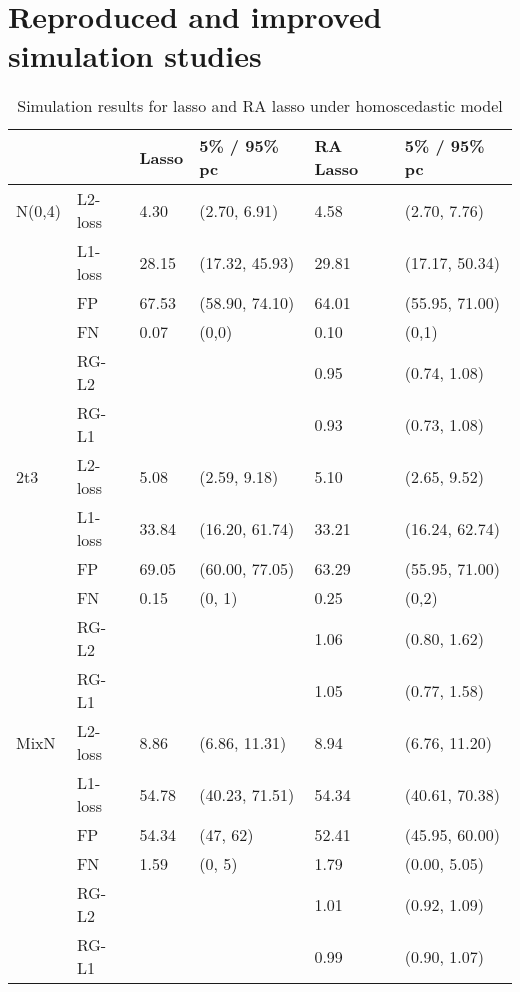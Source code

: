 

\section{Reproduced and improved simulation studies}\label{sec:newsimulation}


\begin{table}[]
\centering
\begin{tabular}{llllll}
       &         & Lasso    & 5\% / 95\% pc & RA Lasso  & 5\% / 95\% pc \\ \hline
N(0,4) & L2-loss & 4.30 & (2.70, 6.91)     & 4.58  & (2.70, 7.76)     \\
       & L1-loss & 28.15 & (17.32, 45.93)     & 29.81  & (17.17, 50.34)     \\
       & FP      & 67.53    & (58.90, 74.10)             & 64.01     & (55.95, 71.00)           \\
       & FN      & 0.07     & (0,0)                    & 0.10       & (0,1)                    \\
       & RG-L2   &          &                          & 0.95  & (0.74, 1.08)   \\
       & RG-L1   &          &                          & 0.93  & (0.73, 1.08)   \\ \hline
2t3    & L2-loss & 5.08 & (2.59, 9.18)     & 5.10  & (2.65, 9.52)     \\
       & L1-loss & 33.84 & (16.20, 61.74)     & 33.21  & (16.24, 62.74)     \\
       & FP      & 69.05    & (60.00, 77.05)              & 63.29     & (55.95, 71.00)           \\
       & FN      & 0.15     & (0, 1)                   & 0.25      & (0,2)                    \\
       & RG-L2   &          &                          & 1.06 & (0.80, 1.62)   \\
       & RG-L1   &          &                          & 1.05  & (0.77, 1.58)     \\ \hline
MixN   & L2-loss & 8.86 & (6.86, 11.31)    & 8.94  & (6.76, 11.20)    \\
       & L1-loss & 54.78 & (40.23, 71.51)     & 54.34  & (40.61, 70.38)     \\
       & FP      & 54.34    & (47, 62)                 & 52.41     & (45.95, 60.00)           \\
       & FN      & 1.59     & (0, 5)                   & 1.79      & (0.00, 5.05)             \\
       & RG-L2   &          &                          & 1.01 & (0.92, 1.09)   \\
       & RG-L1   &          &                          & 0.99  & (0.90, 1.07)  
\end{tabular}
\caption{Simulation results for lasso and RA lasso under homoscedastic model}
\end{table}


